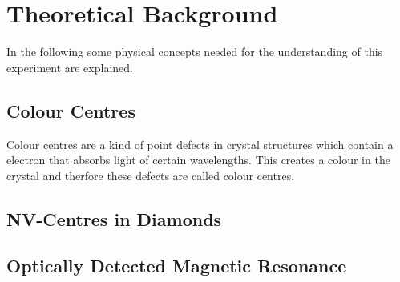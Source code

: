 \section{Theoretical Background}
In the following some physical concepts needed for the understanding of this experiment are explained.
\subsection{Colour Centres}
Colour centres are a kind of point defects in crystal structures which contain a electron that absorbs light of certain wavelengths. This creates a colour in the crystal and therfore these defects are called colour centres.

\subsection{NV-Centres in Diamonds}


\subsection{Optically Detected Magnetic Resonance}
